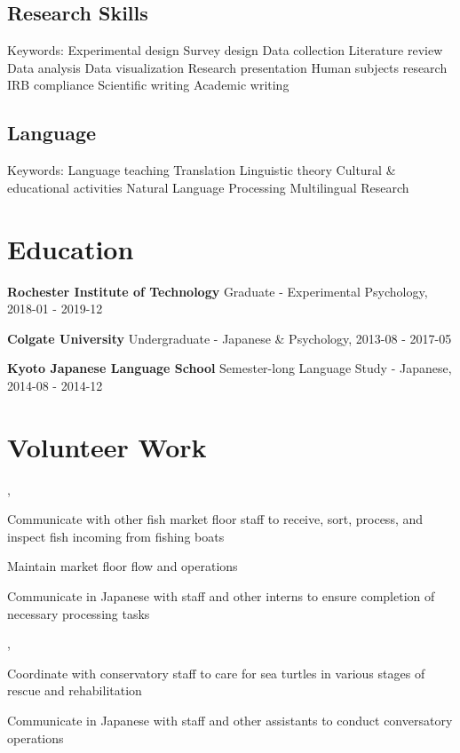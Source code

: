 \documentclass[letterpaper]{deedy-resume_sm}
\begin{document}
\subsection{Research Skills}
Keywords: Experimental design \textbullet{} Survey design \textbullet{} Data collection \textbullet{} Literature review \textbullet{} Data analysis \textbullet{} Data visualization \textbullet{} Research presentation \textbullet{} Human subjects research \textbullet{} IRB compliance \textbullet{} Scientific writing \textbullet{} Academic writing

\subsection{Language}
Keywords: Language teaching \textbullet{} Translation \textbullet{} Linguistic theory \textbullet{} Cultural \& educational activities \textbullet{} Natural Language Processing \textbullet{} Multilingual Research

\section{Education}
\textbf{Rochester Institute of Technology}
Graduate - Experimental Psychology, 2018-01 - 2019-12

\textbf{Colgate University}
Undergraduate - Japanese \& Psychology, 2013-08 - 2017-05

\textbf{Kyoto Japanese Language School}
Semester-long Language Study - Japanese, 2014-08 - 2014-12

\section{Volunteer Work}
, 
\begin{tightitemize}
\item Communicate with other fish market floor staff to receive, sort, process, and inspect fish incoming from fishing boats
\item Maintain market floor flow and operations
\item Communicate in Japanese with staff and other interns to ensure completion of necessary processing tasks
\end{tightitemize}
\sectionspace

, 
\begin{tightitemize}
\item Coordinate with conservatory staff to care for sea turtles in various stages of rescue and rehabilitation
\item Communicate in Japanese with staff and other assistants to conduct conversatory operations
\end{tightitemize}
\sectionspace
\end{document}
